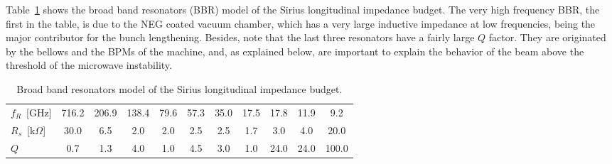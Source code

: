 \begin{apendicesenv}
    Table~\ref{tab:resonator_model} shows the broad band resonators (BBR) model of the Sirius longitudinal impedance budget. The very high frequency BBR, the first in the table, is due to the NEG coated vacuum chamber, which has a very large inductive impedance at low frequencies, being the major contributor for the bunch lengthening. Besides, note that the last three resonators have a fairly large $Q$ factor. They are originated by the bellows and the BPMs of the machine, and, as explained below, are important to explain the behavior of the beam above the threshold of the microwave instability.
    \begin{table}[t]
        \caption{Broad band resonators model of the Sirius longitudinal impedance budget.}
        \label{tab:resonator_model}
        \begin{tabular}{@{}lcccccccccc@{}}\toprule
            $f_R$~[GHz]       & 716.2 & 206.9  & 138.4  &  79.6  &  57.3
                              &  35.0 &  17.5  & 17.8   &  11.9  &   9.2 \\
            $R_s$~[k$\Omega$] & 30.0  &  6.5   &  2.0   &  2.0   &  2.5
                              &  2.5  &  1.7   &  3.0   &  4.0   &  20.0 \\
            $Q$               &  0.7  &  1.3   &  4.0   &  1.0   &   4.5
                              &  3.0  &  1.0   & 24.0   &  24.0  &  100.0 \\\bottomrule
        \end{tabular}
    \end{table}


\end{apendicesenv}

